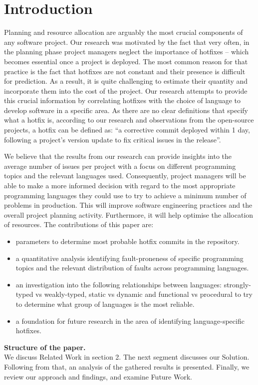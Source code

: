 \section{Introduction}
Planning and resource allocation are arguably the most crucial components of any software project. Our research was motivated by the fact that very often, in the planning phase project managers neglect the importance of hotfixes – which becomes essential once a project is deployed. The most common reason for that practice is the fact that hotfixes are not constant and their presence is difficult for prediction. As a result, it is quite challenging to estimate their quantity and incorporate them into the cost of the project.  Our research attempts to provide this crucial information by correlating hotfixes with the choice of language to develop software in a specific area. As there are no clear definitions that specify what a hotfix is, according to our research and observations from the open-source projects, a hotfix can be defined as: ``a corrective commit deployed within 1 day, following a project's version update to fix critical issues in the release''.\par
We believe that the results from our research can provide insights into the average number of issues per project with a focus on different programming topics and the relevant languages used. Consequently, project managers will be able to make a more informed decision with regard to the most appropriate programming languages they could use to try to achieve a minimum number of problems in production. This will improve software engineering practices and the overall project planning activity. Furthermore, it will help optimise the allocation of resources.
The contributions of this paper are:

\begin{itemize}
  \item parameters to determine most probable hotfix commits in the repository.
  \item a quantitative analysis identifying fault-proneness of specific programming topics and the relevant distribution of faults across programming languages.
  \item an investigation into the following relationships between languages: strongly-typed vs weakly-typed, static vs dynamic and functional vs procedural to try to determine what group of languages is the most reliable.
  \item a foundation for future research in the area of identifying language-specific hotfixes.
\end{itemize}
\par
\textbf{Structure of the paper.}\\
We discuss Related Work in section 2. The next segment discusses our Solution. Following from that, an analysis of the gathered results is presented. Finally, we review our approach and findings, and examine Future Work.


